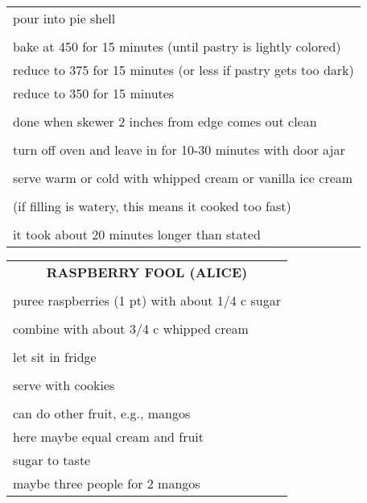 \documentclass[8pt]{report}
\begin{document}
\begin{tabular}{|l|}
pour into pie shell\\
\\
bake at 450 for 15 minutes (until pastry is lightly colored)\\
reduce to 375 for 15 minutes (or less if pastry gets too dark)\\
reduce to 350 for 15 minutes\\
\\
done when skewer 2 inches from edge comes out clean\\
\\
turn off oven and leave in for 10-30 minutes with door ajar\\
\\
serve warm or cold with whipped cream or vanilla ice cream\\
\\
(if filling is watery, this means it cooked too fast)\\
\\
it took about 20 minutes longer than stated\\



\hline


\end{tabular}

\newpage

\centering

\begin{tabular}{|l|} \hline	%
 
\multicolumn{1}{|c|}{\textbf{RASPBERRY FOOL (ALICE)}}
\\
\\

\index{desserts!raspberry fool (alice)} \index{raspberry fool}


puree raspberries (1 pt) with about 1/4 c sugar\\
\\
combine with about 3/4 c whipped cream\\
\\
let sit in fridge\\
\\
serve with cookies\\
\\
can do other fruit, e.g., mangos\\
here maybe equal cream and fruit\\
sugar to taste\\
maybe three people for 2 mangos\\


\hline

\end{tabular}
\end{document}

